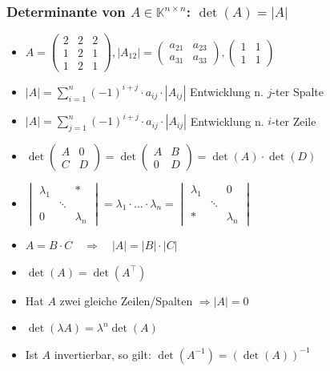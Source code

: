 \documentclass[8pt,a4paper]{scrartcl}
\newcommand{\C}{\ensuremath{\mathbb C}}
\begin{document}
\begin{multicols*}{3}
			\subsubsection{Determinante von $A\in \mathbb K^{n\times n}$: $\det(A)=|A|$}

				\begin{itemize}\itemsep0pt
				\item $A=\begin{pmatrix}2&2&2\\1&2&1\\1&2&1\end{pmatrix},|A_{12}| = \begin{pmatrix}a_{21}&a_{23}\\a_{31}&a_{33}\end{pmatrix},\begin{pmatrix}1&1\\1&1\end{pmatrix} $ 
					\item $|A|=\sum\limits_{i=1}^n (-1)^{i+j} \cdot a_{ij} \cdot |A_{ij}|$ \qquad Entwicklung n. $j$-ter Spalte
					\item $|A|=\sum\limits_{j=1}^n (-1)^{i+j} \cdot a_{ij} \cdot |A_{ij}|$ \qquad Entwicklung n. $i$-ter Zeile
					\item $\det\begin{pmatrix}A&0\\C&D\end{pmatrix}=\det\begin{pmatrix}A&B\\0&D\end{pmatrix}=\det(A)\cdot\det(D)$
					\item $\begin{vmatrix}\lambda_1&&* \\ &\ddots& \\ 0&&\lambda_n \end{vmatrix} = \lambda_1\cdot \ldots\cdot \lambda_n = \begin{vmatrix} \lambda_1&&0  \\  &\ddots& \\  *&&\lambda_n \end{vmatrix}$
					\item $A=B \cdot C \quad \Rightarrow \quad |A|=|B| \cdot |C|$
					\item $\det(A)=\det(A^\top)$
					\item Hat $A$ zwei gleiche Zeilen/Spalten $\Rightarrow |A|=0$
					\item $\det(\lambda A)=\lambda^n \det(A)$
					\item Ist $A$ invertierbar, so gilt: $\det(A^{-1})=(\det(A))^{-1}$

\end{itemize}
\end{multicols*}
\end{document}

